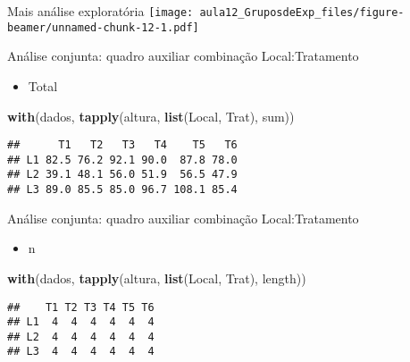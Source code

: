 \documentclass[
  ignorenonframetext,
]{beamer}
\newenvironment{Shaded}{\begin{snugshade}}{\end{snugshade}}
\newcommand{\FunctionTok}[1]{\textcolor[rgb]{0.13,0.29,0.53}{\textbf{#1}}}
\newcommand{\NormalTok}[1]{#1}
\providecommand{\tightlist}{%
  \setlength{\itemsep}{0pt}\setlength{\parskip}{0pt}}
\begin{document}
\begin{frame}{Mais análise exploratória}
\protect\hypertarget{mais-anuxe1lise-exploratuxf3ria-1}{}
\texttt{[image: aula12\_GruposdeExp\_files/figure-beamer/unnamed-chunk-12-1.pdf]}
\end{frame}

\begin{frame}[fragile]{Análise conjunta: quadro auxiliar combinação
Local:Tratamento}
\protect\hypertarget{anuxe1lise-conjunta-quadro-auxiliar-combinauxe7uxe3o-localtratamento}{}
\begin{itemize}
\tightlist
\item
  Total
\end{itemize}

\begin{Shaded}
\begin{Highlighting}[]
\FunctionTok{with}\NormalTok{(dados,}
     \FunctionTok{tapply}\NormalTok{(altura, }\FunctionTok{list}\NormalTok{(Local, Trat), }
\NormalTok{            sum))}
\end{Highlighting}
\end{Shaded}

\begin{verbatim}
##      T1   T2   T3   T4    T5   T6
## L1 82.5 76.2 92.1 90.0  87.8 78.0
## L2 39.1 48.1 56.0 51.9  56.5 47.9
## L3 89.0 85.5 85.0 96.7 108.1 85.4
\end{verbatim}
\end{frame}

\begin{frame}[fragile]{Análise conjunta: quadro auxiliar combinação
Local:Tratamento}
\protect\hypertarget{anuxe1lise-conjunta-quadro-auxiliar-combinauxe7uxe3o-localtratamento-1}{}
\begin{itemize}
\tightlist
\item
  n
\end{itemize}

\begin{Shaded}
\begin{Highlighting}[]
\FunctionTok{with}\NormalTok{(dados,}
     \FunctionTok{tapply}\NormalTok{(altura, }\FunctionTok{list}\NormalTok{(Local, Trat), }
\NormalTok{            length))}
\end{Highlighting}
\end{Shaded}

\begin{verbatim}
##    T1 T2 T3 T4 T5 T6
## L1  4  4  4  4  4  4
## L2  4  4  4  4  4  4
## L3  4  4  4  4  4  4
\end{verbatim}
\end{frame}
\end{document}
